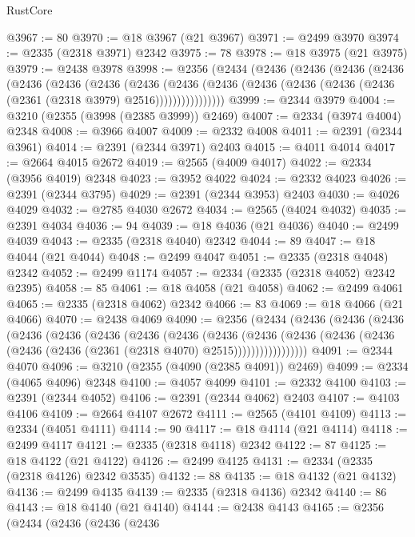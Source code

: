 \begin{lexlean}{RustCore}
\begin{coremodule}
@3967 := 80
@3970 := @18 @3967 (@21 @3967)
@3971 := @2499 @3970
@3974 := @2335 (@2318 @3971) @2342
@3975 := 78
@3978 := @18 @3975 (@21 @3975)
@3979 := @2438 @3978
@3998 := @2356
    (@2434
      (@2436
        (@2436
          (@2436
            (@2436
              (@2436
                (@2436
                  (@2436
                    (@2436
                      (@2436
                        (@2436
                          (@2436 (@2436 (@2436 (@2436 (@2361 (@2318 @3979) @2516))))))))))))))))
@3999 := @2344 @3979
@4004 := @3210 (@2355 (@3998 (@2385 @3999)) @2469)
@4007 := @2334 (@3974 @4004) @2348
@4008 := @3966 @4007
@4009 := @2332 @4008
@4011 := @2391 (@2344 @3961)
@4014 := @2391 (@2344 @3971) @2403
@4015 := @4011 @4014
@4017 := @2664 @4015 @2672
@4019 := @2565 (@4009 @4017)
@4022 := @2334 (@3956 @4019) @2348
@4023 := @3952 @4022
@4024 := @2332 @4023
@4026 := @2391 (@2344 @3795)
@4029 := @2391 (@2344 @3953) @2403
@4030 := @4026 @4029
@4032 := @2785 @4030 @2672
@4034 := @2565 (@4024 @4032)
@4035 := @2391 @4034
@4036 := 94
@4039 := @18 @4036 (@21 @4036)
@4040 := @2499 @4039
@4043 := @2335 (@2318 @4040) @2342
@4044 := 89
@4047 := @18 @4044 (@21 @4044)
@4048 := @2499 @4047
@4051 := @2335 (@2318 @4048) @2342
@4052 := @2499 @1174
@4057 := @2334 (@2335 (@2318 @4052) @2342 @2395)
@4058 := 85
@4061 := @18 @4058 (@21 @4058)
@4062 := @2499 @4061
@4065 := @2335 (@2318 @4062) @2342
@4066 := 83
@4069 := @18 @4066 (@21 @4066)
@4070 := @2438 @4069
@4090 := @2356
    (@2434
      (@2436
        (@2436
          (@2436
            (@2436
              (@2436
                (@2436
                  (@2436
                    (@2436
                      (@2436
                        (@2436
                          (@2436
                            (@2436 (@2436 (@2436 (@2436 (@2361 (@2318 @4070) @2515)))))))))))))))))
@4091 := @2344 @4070
@4096 := @3210 (@2355 (@4090 (@2385 @4091)) @2469)
@4099 := @2334 (@4065 @4096) @2348
@4100 := @4057 @4099
@4101 := @2332 @4100
@4103 := @2391 (@2344 @4052)
@4106 := @2391 (@2344 @4062) @2403
@4107 := @4103 @4106
@4109 := @2664 @4107 @2672
@4111 := @2565 (@4101 @4109)
@4113 := @2334 (@4051 @4111)
@4114 := 90
@4117 := @18 @4114 (@21 @4114)
@4118 := @2499 @4117
@4121 := @2335 (@2318 @4118) @2342
@4122 := 87
@4125 := @18 @4122 (@21 @4122)
@4126 := @2499 @4125
@4131 := @2334 (@2335 (@2318 @4126) @2342 @3535)
@4132 := 88
@4135 := @18 @4132 (@21 @4132)
@4136 := @2499 @4135
@4139 := @2335 (@2318 @4136) @2342
@4140 := 86
@4143 := @18 @4140 (@21 @4140)
@4144 := @2438 @4143
@4165 := @2356
    (@2434
      (@2436
        (@2436
          (@2436

\end{coremodule}
\end{lexlean}
